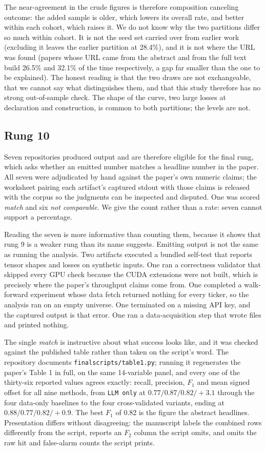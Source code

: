The near-agreement in the crude figures is therefore composition canceling
outcome: the added sample is older, which lowers its overall rate, and better
within each cohort, which raises it. We do not know why the two partitions differ
so much within cohort. It is not the seed set carried over from earlier work
(excluding it leaves the earlier partition at 28.4\%), and it is not where the
URL was found (papers whose URL came from the abstract and from the full text
build 26.5\% and 32.1\% of the time respectively, a gap far smaller than the one
to be explained). The honest reading is that the two draws
are not exchangeable, that we cannot say what distinguishes them, and that this
study therefore has no strong out-of-sample check. The shape of the curve, two
large losses at declaration and construction, is common to both partitions; the
levels are not.

\subsection{Rung 10}\label{sec:rung10_results}

Seven repositories produced output and are therefore eligible for the final rung,
which asks whether an emitted number matches a headline number in the paper. All
seven were adjudicated by hand against the paper's own numeric claims; the
worksheet pairing each artifact's captured stdout with those claims is released
with the corpus so the judgments can be inspected and disputed. One was scored
\emph{match} and six \emph{not comparable}. We give the count rather than a rate:
seven cannot support a percentage.

Reading the seven is more informative than counting them, because it shows that
rung 9 is a weaker rung than its name suggests. Emitting output is not the same
as running the analysis. Two artifacts executed a bundled self-test that reports
tensor shapes and losses on synthetic inputs. One ran a correctness validator
that skipped every GPU check because the CUDA extensions were not built, which
is precisely where the paper's throughput claims come from. One completed a
walk-forward experiment whose data fetch returned nothing for every ticker, so
the analysis ran on an empty universe. One terminated on a missing API key, and
the captured output is that error. One ran a data-acquisition step that wrote
files and printed nothing.

The single \emph{match} is instructive about what success looks like, and it was
checked against the published table rather than taken on the script's word. The
repository documents \texttt{finalscripts/table1.py}; running it regenerates the
paper's Table 1 in full, on the same 14-variable panel, and every one of the
thirty-six reported values agrees exactly: recall, precision, $F_1$ and mean
signed offset for all nine methods, from \texttt{LLM only} at
$0.77/0.87/0.82/{+}3.1$ through the four data-only baselines to the four
cross-validated variants, ending at $0.88/0.77/0.82/{+}0.9$. The best $F_1$ of
0.82 is the figure the abstract headlines. Presentation differs without
disagreeing: the manuscript labels the combined rows differently from the script,
reports an $F_2$ column the script omits, and omits the raw hit and false-alarm
counts the script prints.

